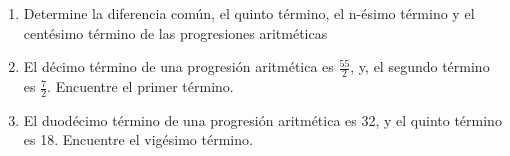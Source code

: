 \documentclass[10pt,twoside]{article}
\begin{document}
\begin{enumerate}
\section*{Sucesiones y progresiones}
Para las secuencias dadas en \ref{first}--\ref{second}
\begin{enumerate}
\item Encuentre los cinco primeros términos para la sucesión dada.
\item ¿Cuál es la diferencia común $d$?
\item Grafique los términos que encuentre en \textit{a)}
\end{enumerate}
\ref{third}--\ref{fourth} Encuentre el $n-\'{e}simo$ t\'{e}rmino de la progresi\'{o}n aritm\'{e}tica dado el primer t\'{e}rmino $a_{1}$ y la diferencia com\'{u}n $d$. ¿Cu\'{a}l es el d\'{e}cimo t\'{e}rmino?
\item Determine la diferencia común, el quinto término, el n-ésimo término y el centésimo término de las progresiones aritméticas
\begin{enumerate}
\end{enumerate}
\item El décimo término de una progresión aritmética es $\frac{55}{2}$, y, el segundo término es $\frac{7}{2}$. Encuentre el primer término.
\item El duodécimo término de una progresión aritmética es 32, y el quinto término es 18. Encuentre el vigésimo término.
\end{enumerate}
\end{document}
